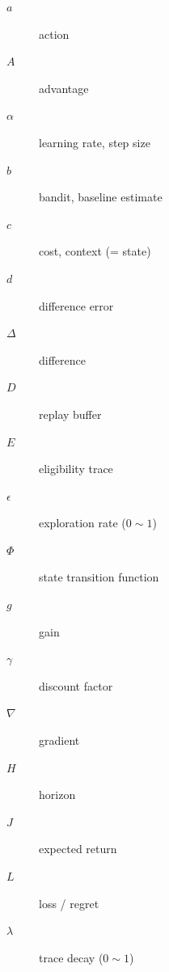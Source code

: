 \documentclass[10pt,landscape]{article}
\begin{document}
\begin{multicols}{3}
\begin{multicols}{2}
\begin{description}
    \item[$a$]
    action %
    \item[$A$]
    advantage
    \item[$\alpha$]
    learning rate, step size
    \item[$b$]
    bandit, baseline estimate %
    \item[$c$]
    cost, context (= state)
    \item[$d$]
    difference error
    \item[$\Delta$]
    difference
    \item[$D$]
    replay buffer
    \item[$E$]
    eligibility trace %
    \item[$\epsilon$]
    exploration rate ($0 \sim 1$)
    \item[$\Phi$]
    state transition function
    \item[$g$]
    gain %
    \item[$\gamma$]
    discount factor
    \item[$\nabla$]
    gradient %
    \item[$H$]
    horizon
    \item[$J$]
    expected return %
    \item[$L$]
    loss / regret %
    \item[$\lambda$]
    trace decay ($0 \sim 1$)

\end{description}
\end{multicols}
\end{multicols}
\end{document}
